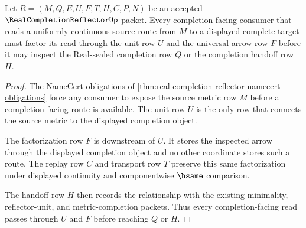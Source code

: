 \begin{theorem}
\label{thm:real-completion-reflector-universal-arrow-factorization}
Let $R=(M,Q,E,U,F,T,H,C,P,N)$ be an accepted $\RealCompletionReflectorUp$ packet. Every completion-facing consumer that reads a uniformly continuous source route from $M$ to a displayed complete target must factor its read through the unit row $U$ and the universal-arrow row $F$ before it may inspect the Real-sealed completion row $Q$ or the completion handoff row $H$.
\end{theorem}
\begin{proof}
The NameCert obligations of \autoref{thm:real-completion-reflector-namecert-obligations} force any consumer to expose the source metric row $M$ before a completion-facing route is available. The unit row $U$ is the only row that connects the source metric to the displayed completion object.

The factorization row $F$ is downstream of $U$. It stores the inspected arrow through the displayed completion object and no other coordinate stores such a route. The replay row $C$ and transport row $T$ preserve this same factorization under displayed continuity and componentwise $\hsame$ comparison.

The handoff row $H$ then records the relationship with the existing minimality, reflector-unit, and metric-completion packets. Thus every completion-facing read passes through $U$ and $F$ before reaching $Q$ or $H$.
\end{proof}

